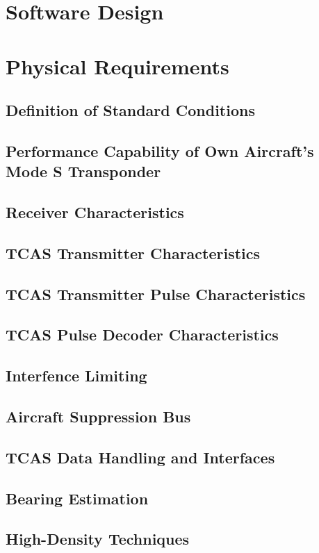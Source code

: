 \documentclass[12pt]{report}
\begin{document}
\section{Software Design}
\section{Physical Requirements}
\subsection{Definition of Standard Conditions}
\subsection{Performance Capability of Own Aircraft's Mode S Transponder}
\subsection{Receiver Characteristics}
\subsection{TCAS Transmitter Characteristics}
\subsection{TCAS Transmitter Pulse Characteristics}
\subsection{TCAS Pulse Decoder Characteristics}
\subsection{Interfence Limiting}
\subsection{Aircraft Suppression Bus}
\subsection{TCAS Data Handling and Interfaces}
\subsection{Bearing Estimation}
\subsection{High-Density Techniques}
\end{document}
